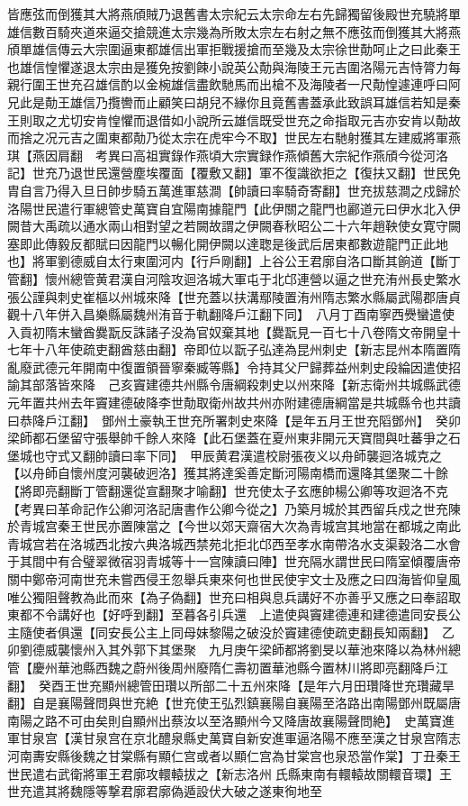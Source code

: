 皆應弦而倒獲其大將燕頎賊乃退舊書太宗紀云太宗命左右先歸獨留後殿世充驍將單雄信數百騎夾道來逼交搶競進太宗幾為所敗太宗左右射之無不應弦而倒獲其大將燕頎單雄信傳云大宗圍逼東都雄信出軍拒戰援搶而至幾及太宗徐世勣呵止之曰此秦王也雄信惶懼遂退太宗由是獲免按劉餗小說英公勣與海陵王元吉圍洛陽元吉恃膂力每親行圍王世充召雄信酌以金椀雄信盡飲馳馬而出槍不及海陵者一尺勣惶遽連呼曰阿兄此是勣王雄信乃攬轡而止顧笑曰胡兒不緣你且竟舊書蓋承此致誤耳雄信若知是秦王則取之尤切安肯惶懼而退借如小說所云雄信既受世充之命指取元吉亦安肯以勣故而捨之况元吉之圍東都勣乃從太宗在虎牢今不取】世民左右馳射獲其左建威將軍燕琪【燕因肩翻　考異曰高祖實錄作燕頃大宗實録作燕傾舊大宗紀作燕頎今從河洛記】世充乃退世民還營塵埃覆面【覆敷又翻】軍不復識欲拒之【復扶又翻】世民免胄自言乃得入旦日帥步騎五萬進軍慈澗【帥讀曰率騎奇寄翻】世充拔慈澗之戍歸於洛陽世民遣行軍總管史萬寶自宜陽南據龍門【此伊關之龍門也酈道元曰伊水北入伊闕昔大禹疏以通水兩山相對望之若闕故謂之伊闕春秋昭公二十六年趙鞅使女寛守闕塞即此傳毅反都賦曰因龍門以暢化開伊闕以達聦是後武后居東都數遊龍門正此地也】將軍劉德威自太行東圍河内【行戶剛翻】上谷公王君廓自洛口斷其餉道【斷丁管翻】懷州總管黄君漢自河陰攻迴洛城大軍屯于北邙連營以逼之世充洧州長史繁水張公謹與刺史崔樞以州城來降【世充蓋以扶溝鄢陵置洧州隋志繁水縣屬武陽郡唐貞觀十八年併入昌樂縣屬魏州洧音于軌翻降戶江翻下同】　八月丁酉南寧西㸑蠻遣使入貢初隋末蠻酋爨翫反誅諸子没為官奴棄其地【爨翫見一百七十八卷隋文帝開皇十七年十八年使疏吏翻酋慈由翻】帝即位以翫子弘達為昆州刺史【新志昆州本隋置隋亂廢武德元年開南中復置領晉寧秦臧等縣】令持其父尸歸葬益州刺史段綸因遣使招諭其部落皆來降　己亥竇建德共州縣令唐綱殺刺史以州來降【新志衛州共城縣武德元年置共州去年竇建德破降李世勣取衛州故共州亦附建德唐綱當是共城縣令也共讀曰恭降戶江翻】　鄧州土豪執王世充所署刺史來降【是年五月王世充䧟鄧州】　癸卯梁師都石堡留守張舉帥千餘人來降【此石堡蓋在夏州東非開元天寶間與吐蕃爭之石堡城也守式又翻帥讀曰率下同】　甲辰黄君漢遣校尉張夜义以舟師襲迴洛城克之【以舟師自懷州度河襲破迥洛】獲其將達奚善定斷河陽南橋而還降其堡聚二十餘【將即亮翻斷丁管翻還從宣翻聚才喻翻】世充使太子玄應帥楊公卿等攻迴洛不克　【考異曰革命記作公卿河洛記唐書作公卿今從之】乃築月城於其西留兵戍之世充陳於青城宫秦王世民亦置陳當之【今世以郊天齋宿大次為青城宫其地當在都城之南此青城宫若在洛城西北按六典洛城西禁苑北拒北邙西至孝水南帶洛水支渠穀洛二水會于其間中有合璧翠微宿羽青城等十一宫陳讀曰陣】世充隔水謂世民曰隋室傾覆唐帝關中鄭帝河南世充未嘗西侵王忽舉兵東來何也世民使宇文士及應之曰四海皆仰皇風唯公獨阻聲教為此而來【為子偽翻】世充曰相與息兵講好不亦善乎又應之曰奉詔取東都不令講好也【好呼到翻】至暮各引兵還　上遣使與竇建德連和建德遣同安長公主隨使者俱還【同安長公主上同母妺黎陽之破没於竇建德使疏吏翻長知兩翻】　乙卯劉德威襲懷州入其外郭下其堡聚　九月庚午梁師都將劉旻以華池來降以為林州總管【慶州華池縣西魏之蔚州後周州廢隋仁壽初置華池縣今置林川將即亮翻降戶江翻】　癸酉王世充顯州總管田瓚以所部二十五州來降【是年六月田瓚降世充瓚藏旱翻】自是襄陽聲問與世充絶【世充使王弘烈鎮襄陽自襄陽至洛路出南陽鄧州既屬唐南陽之路不可由矣則自顯州出蔡汝以至洛顯州今又降唐故襄陽聲問絶】　史萬寶進軍甘泉宫【漢甘泉宫在京北醴泉縣史萬寶自新安進軍逼洛陽不應至漢之甘泉宫隋志河南夀安縣後魏之甘棠縣有顯仁宫或者以顯仁宫為甘棠宫也泉恐當作棠】丁丑秦王世民遣右武衛將軍王君廓攻轘轅拔之【新志洛州氏縣東南有轘轅故關轘音環】王世充遣其將魏隱等撃君廓君廓偽遁設伏大破之遂東徇地至
